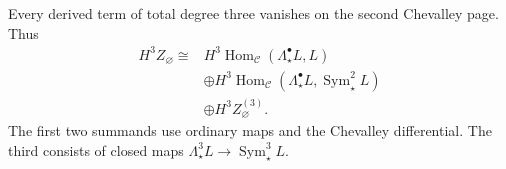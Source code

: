 \begin{theorem}\label{v4-arith:centers:thm:degree-three}
Every derived term
of total degree
three vanishes on
the second Chevalley
page. Thus
\[
\begin{split}
 H^3Z_\varnothing
 \cong{}&
 H^3\operatorname{Hom}_{\mathcal C}
       (\Lambda^\bullet_\star L,L)\\
 &\oplus
 H^3\operatorname{Hom}_{\mathcal C}
       (\Lambda^\bullet_\star L,\operatorname{Sym}^2_\star L)\\
 &\oplus H^3Z_\varnothing^{(3)}.
\end{split}
\]
The first two
summands use
ordinary maps and
the Chevalley
differential.
The third consists
of closed maps
$\Lambda^3_\star L\to
\operatorname{Sym}^3_\star L$.
\end{theorem}

